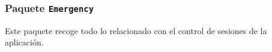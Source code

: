 \subsubsection{Paquete \texttt{Emergency}}

Este paquete recoge todo lo relacionado con el control de sesiones de la aplicación.

